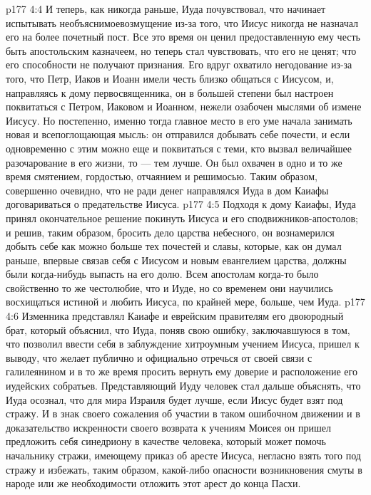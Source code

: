 \vs p177 4:4 И теперь, как никогда раньше, Иуда почувствовал, что начинает испытывать необъяснимоевозмущение из\hyp{}за того, что Иисус никогда не назначал его на более почетный пост. Все это время он ценил предоставленную ему честь быть апостольским казначеем, но теперь стал чувствовать, что его не ценят; что его способности не получают признания. Его вдруг охватило негодование из\hyp{}за того, что Петр, Иаков и Иоанн имели честь близко общаться с Иисусом, и, направляясь к дому первосвященника, он в большей степени был настроен поквитаться с Петром, Иаковом и Иоанном, нежели озабочен мыслями об измене Иисусу. Но постепенно, именно тогда главное место в его уме начала занимать новая и всепоглощающая мысль: он отправился добывать себе почести, и если одновременно с этим можно еще и поквитаться с теми, кто вызвал величайшее разочарование в его жизни, то --- тем лучше. Он был охвачен в одно и то же время смятением, гордостью, отчаянием и решимосью. Таким образом, совершенно очевидно, что не ради денег направлялся Иуда в дом Каиафы договариваться о предательстве Иисуса.
\vs p177 4:5 Подходя к дому Каиафы, Иуда принял окончательное решение покинуть Иисуса и его сподвижников\hyp{}апостолов; и решив, таким образом, бросить дело царства небесного, он вознамерился добыть себе как можно больше тех почестей и славы, которые, как он думал раньше, впервые связав себя с Иисусом и новым евангелием царства, должны были когда\hyp{}нибудь выпасть на его долю. Всем апостолам когда\hyp{}то было свойственно то же честолюбие, что и Иуде, но со временем они научились восхищаться истиной и любить Иисуса, по крайней мере, больше, чем Иуда.
\vs p177 4:6 Изменника представлял Каиафе и еврейским правителям его двоюродный брат, который объяснил, что Иуда, поняв свою ошибку, заключавшуюся в том, что позволил ввести себя в заблуждение хитроумным учением Иисуса, пришел к выводу, что желает публично и официально отречься от своей связи с галилеянином и в то же время просить вернуть ему доверие и расположение его иудейских собратьев. Представляющий Иуду человек стал дальше объяснять, что Иуда осознал, что для мира Израиля будет лучше, если Иисус будет взят под стражу. И в знак своего сожаления об участии в таком ошибочном движении и в доказательство искренности своего возврата к учениям Моисея он пришел предложить себя синедриону в качестве человека, который может помочь начальнику стражи, имеющему приказ об аресте Иисуса, негласно взять того под стражу и избежать, таким образом, какой\hyp{}либо опасности возникновения смуты в народе или же необходимости отложить этот арест до конца Пасхи.
